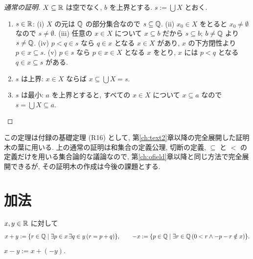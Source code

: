 \begin{proof}[通常の証明]
  $X \subseteq \mathbb{R}$ は空でなく, $b$ を上界とする. $s := \bigcup X$ とおく.
  \begin{enumerate}[label=(\alph*)]
    \item $s \in \mathbb{R}$: (i) $X$ の元は $\mathbb{Q}$ の部分集合なので $s \subseteq \mathbb{Q}$. (ii) $x_0 \in X$ をとると $x_0 \neq \emptyset$ なので $s \neq \emptyset$. (iii) 任意の $x \in X$ について $x \subseteq b$ だから $s \subseteq b$; $b \neq \mathbb{Q}$ より $s \neq \mathbb{Q}$. (iv) $p < q \in s$ なら $q \in x$ となる $x \in X$ があり, $x$ の下方閉性より $p \in x \subseteq s$. (v) $p \in s$ なら $p \in x \in X$ となる $x$ をとり, $x$ には $p < q$ となる $q \in x \subseteq s$ がある.
    \item $s$ は上界: $x \in X$ ならば $x \subseteq \bigcup X = s$.
    \item $s$ は最小: $a$ を上界とすると, すべての $x \in X$ について $x \subseteq a$ なので $s = \bigcup X \subseteq a$.
  \end{enumerate}
\end{proof}

\begin{rem}
  この定理は付録の基礎定理 (R16) として, 第\ref{ch:text2}章以降の完全展開した証明木の葉に用いる. 上の通常の証明は和集合の定義公理, 切断の定義, $\subseteq$ と $<$ の定義だけを用いる集合論的な議論なので, 第\ref{ch:ofield}章以降と同じ方法で完全展開できるが, その証明木の作成は今後の課題とする.
\end{rem}

\section{加法}

\begin{dfn}
  $x, y \in \mathbb{R}$ に対して
  \[ x + y := \{r \in \mathbb{Q} \mid \exists p \in x\,\exists q \in y\,(r = p + q)\}, \qquad -x := \{p \in \mathbb{Q} \mid \exists r \in \mathbb{Q}\,(0 < r \land -p - r \notin x)\}. \]
  $x - y := x + (-y)$.
\end{dfn}

